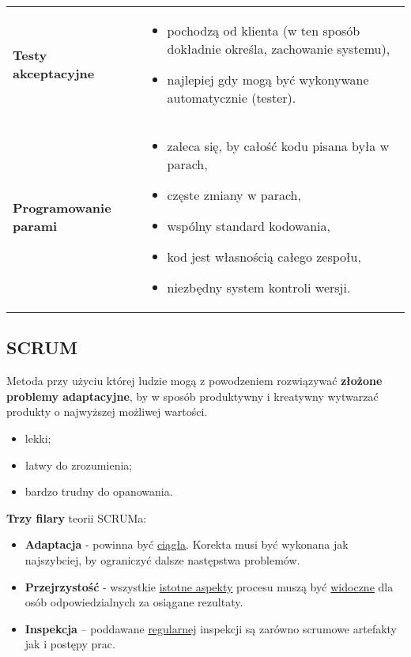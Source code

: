 \documentclass[../main.tex]{subfiles}
\begin{document}
\begin{table}[H]
\begin{center}
\begin{tabular}{ p{8cm} p{8cm} }
                \cmidrule(r){1-1}\cmidrule(l){2-2}
                \textbf{Testy akceptacyjne}
                &
                \begin{itemize}
                    \item pochodzą od klienta (w ten sposób dokładnie określa,
                    zachowanie systemu),
                    \item najlepiej gdy mogą być wykonywane automatycznie (tester).
                \end{itemize}
                \\

                \cmidrule(r){1-1}\cmidrule(l){2-2}
                \textbf{Programowanie parami}
                &
                \begin{itemize}
                    \item zaleca się, by całość kodu pisana była w parach,
                    \item częste zmiany w parach,
                    \item wspólny standard kodowania,
                    \item kod jest własnością całego zespołu,
                    \item niezbędny system kontroli wersji.
                \end{itemize}
                \\
            \end{tabular}
        \end{center}
    \end{table}

    \subsection{SCRUM}
    Metoda przy użyciu której ludzie mogą z powodzeniem rozwiązywać \textbf{złożone problemy
    adaptacyjne}, by w sposób produktywny i kreatywny wytwarzać produkty o najwyższej możliwej wartości.
    \begin{itemize}
        \item lekki;
        \item łatwy do zrozumienia;
        \item bardzo trudny do opanowania.
    \end{itemize}

    \textbf{Trzy filary} teorii SCRUMa:
    \begin{itemize}
        \item \textbf{Adaptacja} - powinna być \underline{ciągła}. Korekta musi być
        wykonana jak najszybciej, by ograniczyć dalsze następstwa problemów.
        \item \textbf{Przejrzystość} - wszystkie \underline{istotne aspekty} procesu
        muszą być \underline{widoczne} dla osób odpowiedzialnych za osiągane rezultaty.
        \item \textbf{Inspekcja} – poddawane \underline{regularnej} inspekcji są zarówno scrumowe
        artefakty jak i postępy prac.
    \end{itemize}
\end{document}
